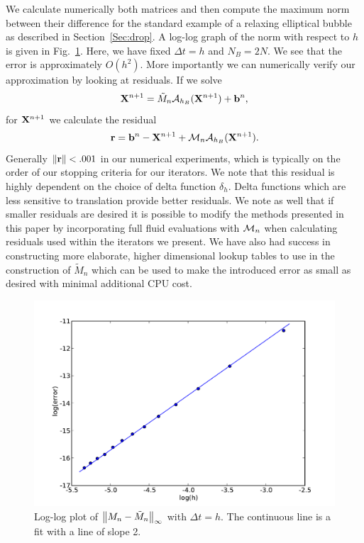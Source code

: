  We calculate numerically both matrices and then compute the maximum norm between their difference for the standard example of
 a relaxing elliptical bubble as described in Section~\ref{Sec:drop}. A log-log graph of the norm with respect to $h$ is given in 
 Fig.~\ref{fig:loglog15}. Here, we have fixed $\Delta t = h$ and $N_B=2N$. We see that the error is approximately $O(h^2)$. More importantly we can numerically verify our approximation by looking at residuals. If we solve
\begin{equation}
\mathbf{X}^{n+1} = \tilde{M}_n\mathcal{A}_{h_B} (\mathbf{X}^{n+1}) + \mathbf{b}^n, \label{meq:Xnl_Again}
\end{equation}
for $\mathbf{X}^{n+1}$ we calculate the residual
\begin{equation}
\mathbf{r} = \mathbf{b}^n - \mathbf{X}^{n+1} + \mathcal{M}_n\mathcal{A}_{h_B} (\mathbf{X}^{n+1}).
\end{equation}
Generally $\left\lVert\mathbf{r}\right\rVert < .001$ in our numerical experiments, which is typically on the order of our stopping criteria for our iterators. We note that this residual is highly dependent on the choice of delta function $\delta_h$. Delta functions which are less sensitive to translation provide better residuals. We note as well that if smaller residuals are desired it is possible to modify the methods presented in this paper by incorporating full fluid evaluations with $\mathcal{M}_n$ when calculating residuals used within the iterators we present. We have also had success in constructing more elaborate, higher dimensional lookup tables to use in the construction of $\tilde{M}_n$ which can be used to make the introduced error as small as desired with minimal additional CPU cost.

\begin{figure}[!b]
  \begin{center}
    \includegraphics[bb=0in 0in 7.7in 6.3in,width=4.8in,clip]{Images_Methodology/matrixerror.pdf}
  \end{center}
  \caption{\small Log-log plot of $\left\lVert M_n-\tilde{M}_n\right\rVert_\infty$ with $\Delta t = h$. The continuous line is a fit with a line of slope 2.}
  \label{fig:loglog15}
\end{figure}




